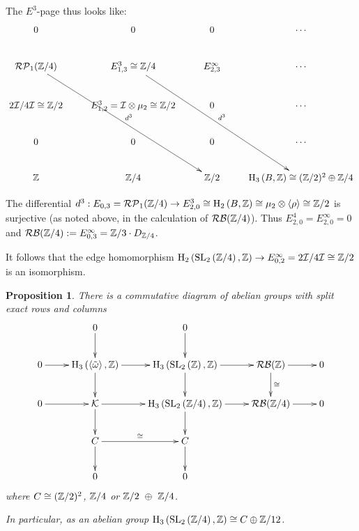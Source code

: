 \documentclass[12pt]{amsart}
\newtheorem{prop}[lem]{Proposition}
\theoremstyle{definition}
\newcommand{\Z}{\Bbb{Z}}
\newcommand{\spl}[2]{\operatorname{SL}_{#1}\left(#2\right)}
\newcommand{\rpbker}[1]{\mathcal{RP}_1(#1)}%
\newcommand{\rbl}[1]{{\mathcal{RB}}(#1)}%
\newcommand{\cconst}[1]{D_{#1}}
\newcommand{\<}{\langle}
\renewcommand{\>}{\rangle}
\newcommand{\an}[1]{\left\langle{#1}\right\rangle}
\newcommand{\ho}[3]{\mathrm{H}_{#1}\left( #2,#3 \right)}
\begin{document}
The $E^3$-page thus  looks like:
\[
\xymatrix{
0&0&0&\cdots\\
\rpbker{\Z/4}\ar^-{d^3}[rrddd]&E^3_{1,3}\cong\Z/4\ar^-{d^3}[rrddd]&E^\infty_{2,3}&\cdots\\
2\mathcal{I}/4\mathcal{I}\cong\Z/2&E^3_{1,2}=\mathcal{I}\otimes\mu_2\cong\Z/2&0&\cdots\\
0&0&0&\cdots\\
\Z&\Z/4&\Z/2&\ho{3}{B}{\Z}\cong(\Z/2)^2\oplus\Z/4\\
}
\]

The differential $d^3:E_{0,3}=\rpbker{\Z/4}\to E^3_{2,0}\cong\ho{2}{B}{\Z}\cong\mu_2\otimes\an{\rho}\cong\Z/2$ is surjective (as noted above, in the calculation of $\rbl{\Z/4}$). 
Thus $E^4_{2,0}= E^\infty_{2,0}=0$ and $\rbl{\Z/4}:=E^\infty_{0,3}=\Z/3\cdot\cconst{\Z/4}$. 

It follows that the edge homomorphism $\ho{2}{\spl{2}{\Z/4}}{\Z}\to E^\infty_{0,2}=
2\mathcal{I}/4\mathcal{I}\cong \Z/2$ is an isomorphism.


\begin{prop}\label{prop:z4}  There is a commutative diagram of abelian groups with split exact rows and columns
\[
\xymatrix{
&0\ar[d]&0\ar[d]&&\\
0\ar[r]&\ho{3}{\an{\tilde{\omega}}}{\Z}\ar[r]\ar[d]&\ho{3}{\spl{2}{\Z}}{\Z}\ar[r]\ar[d]&\rbl{\Z}\ar[r]\ar^-{\cong}[d]&0\\
0\ar[r]&\mathcal{K}\ar[r]\ar[d]&\ho{3}{\spl{2}{\Z/4}}{\Z}\ar[r]\ar[d]&\rbl{\Z/4}\ar[r]&0\\
&C\ar^-{\cong}[r]\ar[d]&C \ar[d]&&\\
&0&0&&\\
}
\]
where $C\cong (\Z/2)^2$, $\Z/4$ or $\Z/2 \ \oplus\  \Z/4$.

In particular, as an abelian group $\ho{3}{\spl{2}{\Z/4}}{\Z}\cong C\oplus \Z/12$.
\end{prop}
\end{document}

